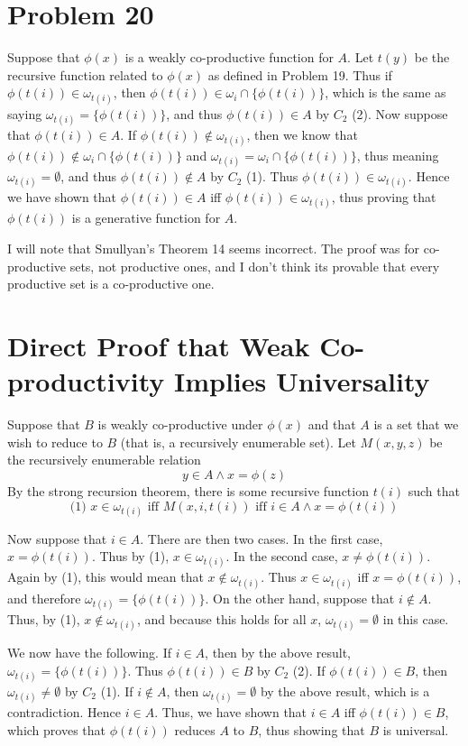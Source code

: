 \documentclass{article}
\theoremstyle{definition}
\begin{document}
\section*{Problem 20}
Suppose that $\phi(x)$ is a weakly co-productive function for $A$. Let $t(y)$ be the recursive function related to $\phi(x)$ as defined in Problem 19. 
Thus if $\phi(t(i))\in\omega_{t(i)}$, then $\phi(t(i))\in\omega_i\cap\{\phi(t(i))\}$, which is the same as saying $\omega_{t(i)}=\{\phi(t(i))\}$, and thus $\phi(t(i))\in A$ by $C_2$ (2).
Now suppose that $\phi(t(i))\in A$. If $\phi(t(i))\notin\omega_{t(i)}$, then we know that $\phi(t(i))\notin\omega_i\cap\{\phi(t(i))\}$ and 
$\omega_{t(i)}=\omega_i\cap\{\phi(t(i))\}$, thus meaning $\omega_{t(i)}=\emptyset$, and thus $\phi(t(i))\notin A$ by $C_2$ (1). Thus $\phi(t(i))\in\omega_{t(i)}$. Hence we have shown that 
$\phi(t(i))\in A$ iff $\phi(t(i))\in\omega_{t(i)}$, thus proving that $\phi(t(i))$ is a generative function for $A$.


I will note that Smullyan's Theorem 14 seems incorrect. The proof was for co-productive sets, not productive ones, and I don't think its provable that every productive set is a co-productive 
one.

\section*{Direct Proof that Weak Co-productivity Implies Universality}
Suppose that $B$ is weakly co-productive under $\phi(x)$ and that $A$ is a set that we wish to reduce to $B$ (that is, a recursively enumerable set). Let $M(x,y,z)$ be the recursively enumerable 
relation \[ y\in A\wedge x=\phi(z) \] By the strong recursion theorem, there is some recursive function $t(i)$ such that 
\[ \textrm{(1) }x\in\omega_{t(i)}\textrm{ iff }M(x,i,t(i))\textrm{ iff }i\in A\wedge x=\phi(t(i)) \] 


Now suppose that $i\in A$. There are then two cases. In the first case, $x=\phi(t(i))$. Thus by (1), $x\in\omega_{t(i)}$. In the second case, $x\ne\phi(t(i))$. Again by 
(1), this would mean that $x\notin\omega_{t(i)}$. Thus $x\in\omega_{t(i)}$ iff $x=\phi(t(i))$, and therefore $\omega_{t(i)}=\{\phi(t(i))\}$. On the other hand, suppose that 
$i\notin A$. Thus, by (1), $x\notin\omega_{t(i)}$, and because this holds for all $x$, $\omega_{t(i)}=\emptyset$ in this case.


We now have the following. If $i\in A$, then by the above result, $\omega_{t(i)}=\{\phi(t(i))\}$. Thus $\phi(t(i))\in B$ by $C_2$ (2). If $\phi(t(i))\in B$, then 
$\omega_{t(i)}\ne\emptyset$ by $C_2$ (1). If $i\notin A$, then $\omega_{t(i)}=\emptyset$ by the above result, which is a contradiction. Hence $i\in A$. Thus, we have shown that 
$i\in A$ iff $\phi(t(i))\in B$, which proves that $\phi(t(i))$ reduces $A$ to $B$, thus showing that $B$ is universal. 
\end{document}
